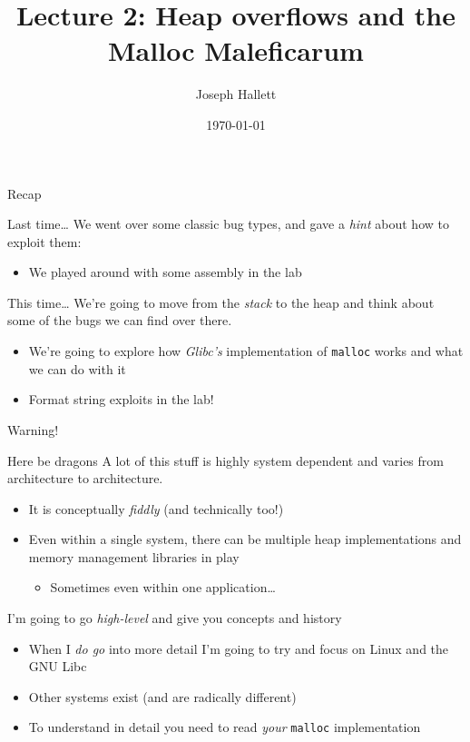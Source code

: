 \documentclass[9pt,aspectratio=169]{beamer}
\author{Joseph Hallett}
\date{\today}
\title{Lecture 2: Heap overflows and the Malloc Maleficarum}
\begin{document}
\maketitle
\begin{frame}[label={sec:org9589f4e},fragile]{Recap}
 \begin{block}{Last time\ldots{}}
We went over some classic bug types, and gave a \emph{hint} about how to exploit them:
\begin{itemize}
\item We played around with some assembly in the lab
\end{itemize}
\end{block}
\begin{block}{This time\ldots{}}
We're going to move from the \emph{stack} to the heap and think about some of the bugs we can find over there.
\begin{itemize}
\item We're going to explore how \emph{Glibc's} implementation of \texttt{malloc} works and what we can do with it
\item Format string exploits in the lab!
\end{itemize}
\end{block}
\end{frame}
\begin{frame}[label={sec:org569aae3},fragile]{Warning!}
 \begin{block}{Here be dragons}
A lot of this stuff is highly system dependent and varies from architecture to architecture.
\begin{itemize}
\item It is conceptually \emph{fiddly} (and technically too!)
\item Even within a single system, there can be multiple heap implementations and memory management libraries in play
\begin{itemize}
\item Sometimes even within one application\ldots{}
\end{itemize}
\end{itemize}

I'm going to go \emph{high-level} and give you concepts and history
\begin{itemize}
\item When I \emph{do go} into more detail I'm going to try and focus on Linux and the GNU Libc
\item Other systems exist (and are radically different)
\item To understand in detail you need to read \emph{your} \texttt{malloc} implementation
\end{itemize}
\end{block}
\end{frame}
\end{document}
